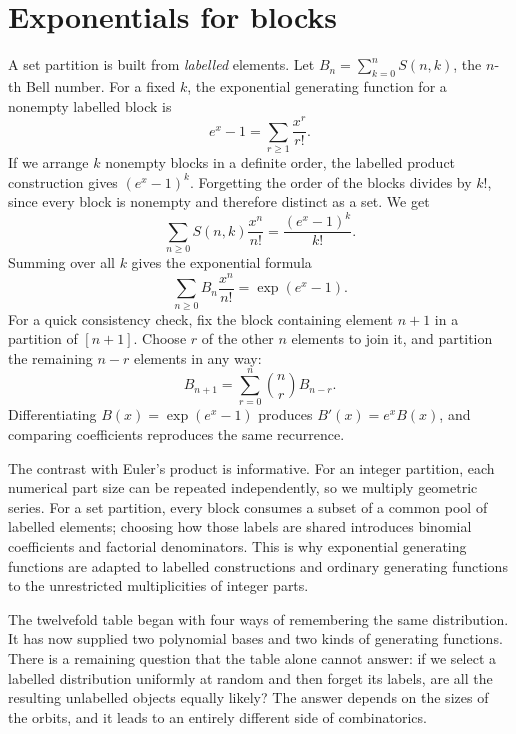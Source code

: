 \section{Exponentials for blocks}

A set partition is built from \emph{labelled} elements. Let \(B_n=\sum_{k=0}^nS(n,k)\), the \(n\)-th Bell number. For a fixed \(k\), the exponential generating function for a nonempty labelled block is
\[
 e^x-1=\sum_{r\ge1}\frac{x^r}{r!}.
\]
If we arrange \(k\) nonempty blocks in a definite order, the labelled product construction gives \((e^x-1)^k\). Forgetting the order of the blocks divides by \(k!\), since every block is nonempty and therefore distinct as a set. We get
\[
 \boxed{\sum_{n\ge0}S(n,k)\frac{x^n}{n!}
 =\frac{(e^x-1)^k}{k!}.}
\]
Summing over all \(k\) gives the exponential formula
\[
 \boxed{\sum_{n\ge0}B_n\frac{x^n}{n!}
       =\exp(e^x-1).}
\]
For a quick consistency check, fix the block containing element \(n+1\) in a partition of \([n+1]\). Choose \(r\) of the other \(n\) elements to join it, and partition the remaining \(n-r\) elements in any way:
\[
 B_{n+1}=\sum_{r=0}^n\binom nr B_{n-r}.
\]
Differentiating \(B(x)=\exp(e^x-1)\) produces \(B'(x)=e^xB(x)\), and comparing coefficients reproduces the same recurrence.

The contrast with Euler's product is informative. For an integer partition, each numerical part size can be repeated independently, so we multiply geometric series. For a set partition, every block consumes a subset of a common pool of labelled elements; choosing how those labels are shared introduces binomial coefficients and factorial denominators. This is why exponential generating functions are adapted to labelled constructions and ordinary generating functions to the unrestricted multiplicities of integer parts.

The twelvefold table began with four ways of remembering the same distribution. It has now supplied two polynomial bases and two kinds of generating functions. There is a remaining question that the table alone cannot answer: if we select a labelled distribution uniformly at random and then forget its labels, are all the resulting unlabelled objects equally likely? The answer depends on the sizes of the orbits, and it leads to an entirely different side of combinatorics.
